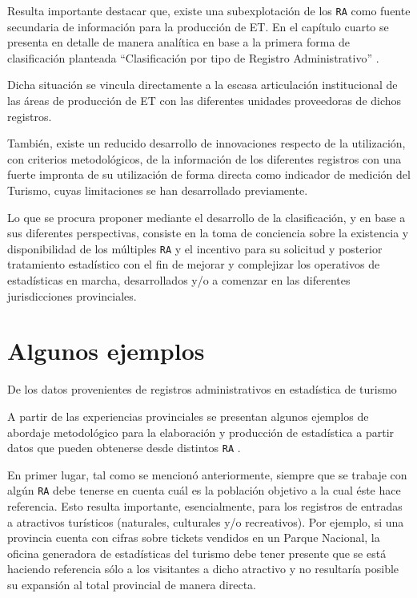 \documentclass[
]{book}
\begin{document}
Resulta importante destacar que, existe una subexplotación de los \texttt{RA} como fuente secundaria de información para la producción de ET. En el capítulo cuarto se presenta en detalle de manera analítica en base a la primera forma de clasificación planteada ``Clasificación por tipo de Registro Administrativo'' .

Dicha situación se vincula directamente a la escasa articulación institucional de las áreas de producción de ET con las diferentes unidades proveedoras de dichos registros.

También, existe un reducido desarrollo de innovaciones respecto de la utilización, con criterios metodológicos, de la información de los diferentes registros con una fuerte impronta de su utilización de forma directa como indicador de medición del Turismo, cuyas limitaciones se han desarrollado previamente.

Lo que se procura proponer mediante el desarrollo de la clasificación, y en base a sus diferentes perspectivas, consiste en la toma de conciencia sobre la existencia y disponibilidad de los múltiples \texttt{RA} y el incentivo para su solicitud y posterior tratamiento estadístico con el fin de mejorar y complejizar los operativos de estadísticas en marcha, desarrollados y/o a comenzar en las diferentes jurisdicciones provinciales.

\hypertarget{algunos-ejemplos}{%
\chapter{\texorpdfstring{\textbf{Algunos ejemplos}}{Algunos ejemplos}}\label{algunos-ejemplos}}

De los datos provenientes de registros administrativos en estadística de turismo

A partir de las experiencias provinciales se presentan algunos ejemplos de abordaje metodológico para la elaboración y producción de estadística a partir datos que pueden obtenerse desde distintos \texttt{RA} .

En primer lugar, tal como se mencionó anteriormente, siempre que se trabaje con algún \texttt{RA} debe tenerse en cuenta cuál es la población objetivo a la cual éste hace referencia. Esto resulta importante, esencialmente, para los registros de entradas a atractivos turísticos (naturales, culturales y/o recreativos). Por ejemplo, si una provincia cuenta con cifras sobre tickets vendidos en un Parque Nacional, la oficina generadora de estadísticas del turismo debe tener presente que se está haciendo referencia sólo a los visitantes a dicho atractivo y no resultaría posible su expansión al total provincial de manera directa.
\end{document}
